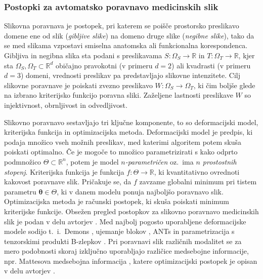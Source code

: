 \documentclass[a4paper,twoside,11pt]{article}
\begin{document}
	\subsubsection*{Postopki za avtomatsko poravnavo medicinskih slik}
	\par{
	  Slikovna poravnava je postopek, pri katerem se poišče prostorsko preslikavo domene ene od slik (\emph{gibljive slike}) na domeno druge slike (\emph{negibne slike}), tako da se med slikama vzpostavi smiselna anatomska ali funkcionalna korespondenca. Gibljiva in negibna slika sta podani s preslikavama $S\colon\Omega_S\rightarrow\mathbb{R}$ in $T\colon\Omega_T\rightarrow\mathbb{R}$, kjer sta $\Omega_S, \Omega_T\subset\mathbb{R}^d$ običajno pravokotni (v primeru $d=2$) ali kvadrasti (v primeru $d=3$) domeni, vrednosti preslikav pa predstavljajo slikovne intenzitete. Cilj slikovne poravnave je poiskati zvezno preslikavo $W:\Omega_S\rightarrow\Omega_T$, ki čim boljše glede na izbrano kriterijsko funkcijo poravna sliki. Zaželjene lastnosti preslikave $W$ so injektivnost, obrnljivost in odvedljivost.
	}
	\par{
	  Slikovno poravnavo sestavljajo tri ključne komponente, to so deformacijski model, kriterijska funkcija in optimizacijska metoda. Deformacijski model je predpis, ki podaja množico vseh možnih preslikav, med katerimi algoritem potem skuša poiskati optimalno. Če je mogoče to množico parametrizirati s kako odprto podmnožico $\Theta\subset\mathbb{R}^n$, potem je model \emph{$n$-parametričen} oz.~ima \emph{$n$ prostostnih stopenj}. Kriterijska funkcija je funkcija $f\colon\Theta\rightarrow\mathbb{R}$, ki kvantitativno ovrednoti kakovost poravnave slik. Pričakuje se, da $f$ zavzame globalni minimum pri tistem parametru $\mathbf{\theta}\in\Theta$, ki v danem modelu ponuja najboljšo poravnavo slik. Optimizacijska metoda je računski postopek, ki skuša poiskati minimum kriterijske funkcije. Obsežen pregled postopkov za slikovno poravnavo medicinskih slik je podan v delu avtorjev \cite{sotiras2013}. Med najbolj pogosto uporabljene deformacijske modele sodijo t.~i.~Demons \citep{vercauteren2009}, ujemanje blokov \citep{ourselin2000}, ANTs \citep{avants2008} in parametrizacija s tenzorskimi produkti B-zlepkov \citep{rueckert1999}. Pri poravnavi slik različnih modalitet se za mero podobnosti skoraj izključno uporabljajo različice medsebojne informacije, npr. Mattesova medsebojna informacija \citep{mattes2003}, katere optimizacijski postopek je opisan v delu avtorjev \cite{thevenaz2000}.
	}
\end{document}
